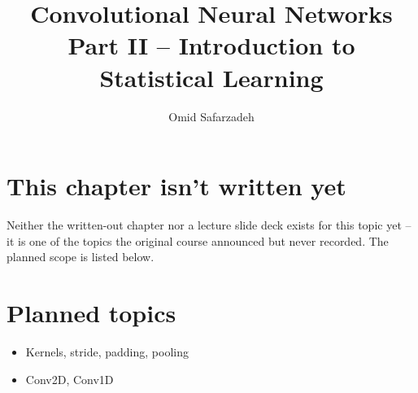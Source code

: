 \documentclass[11pt]{article}
\title{Convolutional Neural Networks \\ \large Part II -- Introduction to Statistical Learning}
\author{Omid Safarzadeh}
\date{}
\begin{document}
\maketitle

\section*{This chapter isn't written yet}
Neither the written-out chapter nor a lecture slide deck exists for this
topic yet -- it is one of the topics the original course announced but
never recorded. The planned scope is listed below.



\section*{Planned topics}
\begin{itemize}
  \item Kernels, stride, padding, pooling
  \item Conv2D, Conv1D
\end{itemize}
\end{document}
